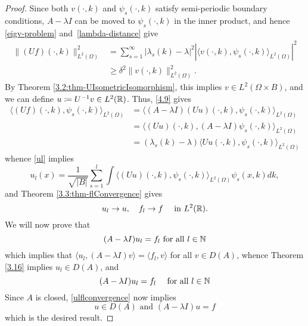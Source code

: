 {\begin{theorem}
\begin{proof}
		Since both $v(\cdot, k)$ and $\psi_{s}(\cdot, k)$ satisfy semi-periodic boundary conditions, $A - \lambda I$ can be moved to $\psi_{s}(\cdot, k)$ in the inner product, and hence \eqref{eigv-problem} and \eqref{lambda-distance} give %
		\begin{align*}
			\| (Uf)(\cdot,k)\|^{2}_{L^{2}(\Omega)} & = \sum_{s=1}^{\infty} |\lambda_{s}(k) - \lambda|^{2} |\langle v(\cdot, k), \psi_{s}(\cdot, k)\rangle_{L^{2}(\Omega)}|^{2} \\
			& \geq \delta^{2} \| v(\cdot, k)\|^{2}_{L^{2}(\Omega)}.
		\end{align*}
		By Theorem \ref{3.2:thm-UIsometricIsomorphism}, this implies $v \in L^{2}(\Omega \times B)$, and we can define $u \coloneqq U^{-1} v \in L^{2}(\mathbb{R})$. Thus, \eqref{4.9} gives
			\begin{align*}
				\langle (Uf)(\cdot, k), \psi_{s}(\cdot, k) \rangle_{L^{2}(\Omega)} & = \langle (A - \lambda I)(Uu)(\cdot, k), \psi_{s}(\cdot, k) \rangle_{L^{2}(\Omega)} \\
					& = \langle (Uu)(\cdot,k), (A - \lambda I) \psi_{s}(\cdot, k) \rangle_{L^{2}(\Omega)} \\
					& = (\lambda_{s}(k) - \lambda) \langle Uu(\cdot, k), \psi_{s}(\cdot, k) \rangle_{L^{2}(\Omega)}
			\end{align*}
		whence \eqref{ul} implies
			\[ u_{l}(x) = \frac{1}{\sqrt{|B|}} \sum_{s=1}^{l} \int \langle (Uu)(\cdot, k), \psi_{s}(\cdot, k)\rangle_{L^{2}(\Omega)} \psi_{s}(x, k) dk, \]
		and Theorem \ref{3.3:thm-flConvergence} gives
			\begin{equation}
				u_{l} \rightarrow u, \quad f_{l} \rightarrow f \quad \text{ in } L^{2}(\mathbb{R}). \label{ulflconvergence}
			\end{equation}
		We will now prove that
		\begin{equation}
				(A - \lambda I) u_{l} = f_{l} \text{ for all } l \in \mathbb{N} \label{lefttoprove}
			\end{equation} 
		which implies that $\langle u_{l}, (A - \lambda I) v \rangle = \langle f_{l}, v\rangle$ for all $v \in D(A)$, whence Theorem \ref{3.16} implies $u_{l} \in D(A)$, and
			\[ (A - \lambda I) u_{l} = f_{l} \quad \text{ for all } l \in \mathbb{N} \]
		Since $A$ is closed, \eqref{ulflconvergence} now implies
			\[ u \in D(A) \text{ and } (A - \lambda I) u = f \]
		which is the desired result.
		

\end{proof}
\end{theorem}}
